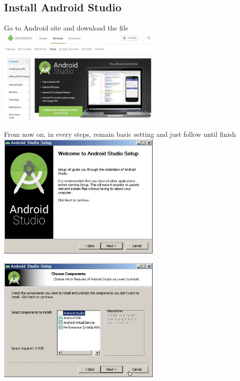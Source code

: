 \documentclass[12pt]{article}
\begin{document}
\subsection{Install Android Studio}
\begin{center}
Go to Android site and download the file\\ [1\baselineskip]
\includegraphics[width=80mm,scale=1.3]{android1}
\end{center}
\newpage

\begin{center}
From now on, in every steps, remain basic setting and just follow until finish\\ [1\baselineskip]
\includegraphics[width=80mm,scale=1.3]{android2}
\end{center}

\begin{center}
\includegraphics[width=80mm,scale=1.3]{android3}
\end{center}
\end{document}

